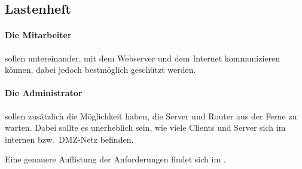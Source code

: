 \subsection{Lastenheft}
\label{sec:Lastenheft}

\paragraph*{Die Mitarbeiter} sollen untereinander, mit dem Webserver und dem Internet kommunizieren können, dabei jedoch bestmöglich geschützt werden.
\paragraph*{Die Administrator} sollen zusätzlich die Möglichkeit haben, die Server und Router aus der Ferne zu warten. Dabei sollte es unerheblich sein, wie viele Clients und Server sich im internen bzw.\ DMZ-Netz befinden.

Eine genauere Auflistung der Anforderungen findet sich im . 

